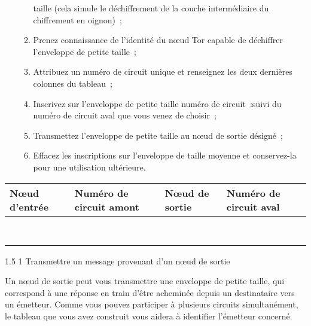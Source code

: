 \documentclass[a4paper,twoside,french]{article}
\makeatletter
\renewcommand\section{\@startsection
  {section}{1}{1cm}%
  {1.5\baselineskip}%
  {1\baselineskip}%
  {\normalfont\Large\bfseries}}%
\makeatother
\begin{document}
\begin{enumerate}
\begin{enumerate}
      taille (cela simule le déchiffrement de la couche intermédiaire
      du chiffrement en oignon)~;
    \item Prenez connaissance de l'identité du n\oe ud Tor capable de
      déchiffrer l'enveloppe de petite taille~;
    \item Attribuez un numéro de circuit unique et renseignez les deux
      dernières colonnes du tableau~;
    \item Inscrivez sur l'enveloppe de petite taille \og numéro de
      circuit~:\fg suivi du numéro de circuit aval que vous venez de
      choisir~;
    \item Transmettez l'enveloppe de petite taille au n\oe ud de
      sortie désigné~;
    \item Effacez les inscriptions sur l'enveloppe de taille moyenne
      et conservez-la pour une utilisation ultérieure.
    \end{enumerate}
  \end{enumerate}
  \begin{center}
    \begin{tabular}{|m{2.5cm}|m{3.5cm}|m{2.5cm}|m{3.5cm}|}
      \hline
      N\oe ud d'entrée & Numéro de circuit amont &  N\oe ud de sortie & Numéro de circuit aval \\
      \hline
      & & & \\
      & & & \\
      \hline
      & & & \\
      & & & \\
      \hline
      & & & \\
      & & & \\
      \hline
      & & & \\
      & & & \\
      \hline
    \end{tabular}
  \end{center}


  \section{Transmettre un message provenant d'un n\oe ud de sortie}

  Un n\oe ud de sortie peut vous transmettre une enveloppe de
  petite taille, qui correspond à une réponse en train d'être
  acheminée depuis un destinataire vers un émetteur. Comme vous pouvez
  participer à plusieurs circuits simultanément, le tableau que vous
  avez construit vous aidera à identifier l'émetteur concerné.
\end{document}
